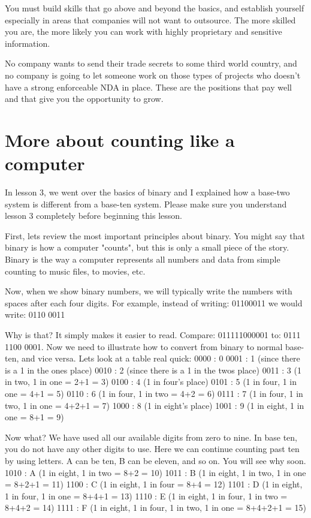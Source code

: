 \documentclass[a4paper,12pt]{article}
\let\stdsection\section
\renewcommand\section{\newpage\stdsection}
\begin{document}
You must build skills that go above and beyond the basics, and establish yourself especially in areas that companies will not want to outsource. The more skilled you are, the more likely you can work with highly proprietary and sensitive information.

No company wants to send their trade secrets to some third world country, and no company is going to let someone work on those types of projects who doesn't have a strong enforceable NDA in place. These are the positions that pay well and that give you the opportunity to grow.
\section{More about counting like a computer}
In lesson 3, we went over the basics of binary and I explained how a base-two system is different from a base-ten system. Please make sure you understand lesson 3 completely before beginning this lesson.

First, lets review the most important principles about binary. You might say that binary is how a computer "counts", but this is only a small piece of the story. Binary is the way a computer represents all numbers and data from simple counting to music files, to movies, etc.

Now, when we show binary numbers, we will typically write the numbers with spaces after each four digits. For example, instead of writing: 01100011 we would write: 0110 0011

Why is that? It simply makes it easier to read. Compare: 011111000001 to: 0111 1100 0001. Now we need to illustrate how to convert from binary to normal base-ten, and vice versa. Lets look at a table real quick:
0000 : 0
0001 : 1 (since there is a 1 in the ones place)
0010 : 2 (since there is a 1 in the twos place)
0011 : 3 (1 in two, 1 in one = 2+1 = 3)
0100 : 4 (1 in four's place)
0101 : 5 (1 in four, 1 in one = 4+1 = 5)
0110 : 6 (1 in four, 1 in two = 4+2 = 6)
0111 : 7 (1 in four, 1 in two, 1 in one = 4+2+1 = 7)
1000 : 8 (1 in eight's place)
1001 : 9 (1 in eight, 1 in one = 8+1 = 9)

Now what? We have used all our available digits from zero to nine. In base ten, you do not have any other digits to use. Here we can continue counting past ten by using letters. A can be ten, B can be eleven, and so on. You will see why soon.
1010 : A (1 in eight, 1 in two = 8+2 = 10)
1011 : B (1 in eight, 1 in two, 1 in one = 8+2+1 = 11)
1100 : C (1 in eight, 1 in four = 8+4 = 12)
1101 : D (1 in eight, 1 in four, 1 in one = 8+4+1 = 13)
1110 : E (1 in eight, 1 in four, 1 in two = 8+4+2 = 14)
1111 : F (1 in eight, 1 in four, 1 in two, 1 in one = 8+4+2+1 = 15)
\end{document}
